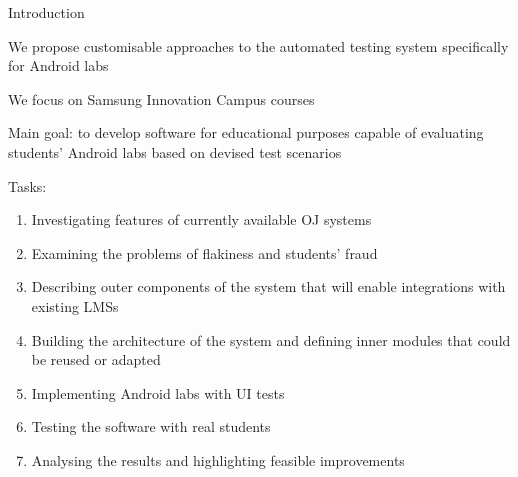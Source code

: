 \documentclass{beamer}%
\begin{document}
\begin{frame}{Introduction}
\footnotesize

We propose customisable approaches to the automated testing system specifically for Android labs

We focus on Samsung Innovation Campus courses

{ Main goal}: to develop software for educational purposes capable of evaluating students' Android labs based on devised test scenarios


Tasks:
\begin{enumerate}
\item Investigating features of currently available OJ systems
\item Examining the problems of flakiness and students' fraud
\item Describing outer components of the system that will enable integrations with existing LMSs
\item Building the architecture of the system and defining inner modules that could be reused or adapted
\item Implementing Android labs with UI tests
\item Testing the software with real students
\item Analysing the results and highlighting feasible improvements
\end{enumerate}



\end{frame}
\end{document}
